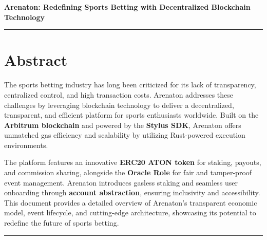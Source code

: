 \documentclass[9pt]{article}
\begin{document}
	
	\begin{titlepage}
		\centering
		\vspace*{1.5cm} %
		\Large
		\textbf{Arenaton: Redefining Sports Betting with Decentralized Blockchain Technology}
		
		\vspace{0.8cm} %
		\rule{\linewidth}{0.5mm}
		
		\section*{Abstract}
		\normalsize %
		The sports betting industry has long been criticized for its lack of transparency, centralized control, and high transaction costs. Arenaton addresses these challenges by leveraging blockchain technology to deliver a decentralized, transparent, and efficient platform for sports enthusiasts worldwide. Built on the \textbf{Arbitrum blockchain} and powered by the \textbf{Stylus SDK}, Arenaton offers unmatched gas efficiency and scalability by utilizing Rust-powered execution environments.
		
		The platform features an innovative \textbf{ERC20 ATON token} for staking, payouts, and commission sharing, alongside the \textbf{Oracle Role} for fair and tamper-proof event management. Arenaton introduces gasless staking and seamless user onboarding through \textbf{account abstraction}, ensuring inclusivity and accessibility. This document provides a detailed overview of Arenaton’s transparent economic model, event lifecycle, and cutting-edge architecture, showcasing its potential to redefine the future of sports betting.
		\vspace{1cm} %
		\rule{\linewidth}{0.5mm}
	\end{titlepage}
	
\end{document}

